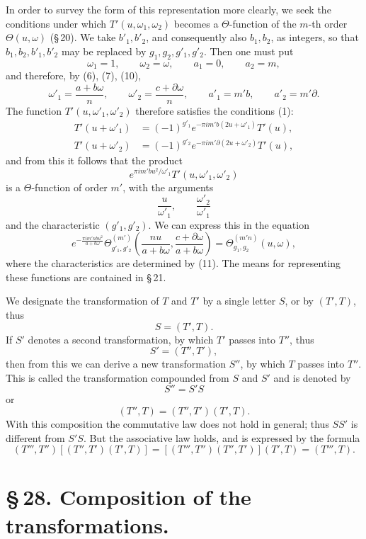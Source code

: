 \documentclass[11pt]{article}
\begin{document}
In order to survey the form of this representation more clearly, we seek the conditions under which $T'(u,\omega_1,\omega_2)$ becomes a $\Theta$-function of the $m$-th order $\Theta(u,\omega)$ (\S\,20). We take $b'_1,b'_2$, and consequently also $b_1,b_2$, as integers, so that $b_1,b_2,b'_1,b'_2$ may be replaced by $g_1,g_2,g'_1,g'_2$. Then one must put
\[
\omega_1=1,
\qquad \omega_2=\omega,
\qquad a_1=0,
\qquad a_2=m,
\]
and therefore, by (6), (7), (10),
\[
\omega'_1=\frac{a+b\omega}{n},
\qquad
\omega'_2=\frac{c+\partial\omega}{n},
\qquad
a'_1=m'b,
\qquad
a'_2=m'\partial.
\]
The function $T'(u,\omega'_1,\omega'_2)$ therefore satisfies the conditions (1):
\begin{align*}
T'(u+\omega'_1)&=(-1)^{g'_1}e^{-\pi i m'b(2u+\omega'_1)}T'(u),\\
T'(u+\omega'_2)&=(-1)^{g'_2}e^{-\pi i m'\partial(2u+\omega'_2)}T'(u),
\end{align*}
and from this it follows that the product
\[
e^{\pi i m'bu^2/\omega'_1}T'(u,\omega'_1,\omega'_2)
\]
is a $\Theta$-function of order $m'$, with the arguments
\[
\frac{u}{\omega'_1},\qquad \frac{\omega'_2}{\omega'_1}
\]
and the characteristic $(g'_1,g'_2)$. We can express this in the equation
\begin{equation}
e^{-\frac{\pi i m'nbu^2}{a+b\omega}}
\Theta_{g'_1,g'_2}^{(m')}
\left(\frac{nu}{a+b\omega},\frac{c+\partial\omega}{a+b\omega}\right)
=\Theta_{g_1,g_2}^{(m'n)}(u,\omega), \tag{12}
\end{equation}
where the characteristics are determined by (11). The means for representing these functions are contained in \S\,21.

We designate the transformation of $T$ and $T'$ by a single letter $S$, or by $(T',T)$, thus
\[
S=(T',T).
\]
If $S'$ denotes a second transformation, by which $T'$ passes into $T''$, thus
\[
S'=(T'',T'),
\]
then from this we can derive a new transformation $S''$, by which $T$ passes into $T''$. This is called the transformation compounded from $S$ and $S'$ and is denoted by
\[
S''=S'S
\]
or
\[
(T'',T)=(T'',T')(T',T).
\]
With this composition the commutative law does not hold in general; thus $SS'$ is different from $S'S$. But the associative law holds, and is expressed by the formula
\[
(T''',T'')[(T'',T')(T',T)]=[(T''',T'')(T'',T')](T',T)=(T''',T).
\]

\section*{\S\,28. Composition of the transformations.}
\end{document}
